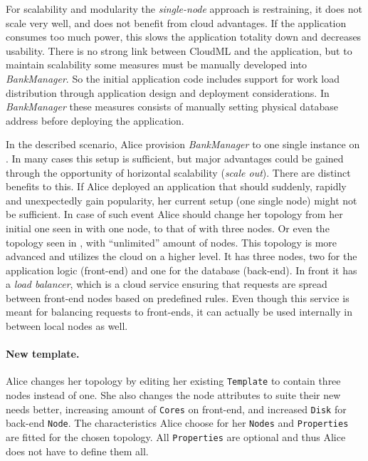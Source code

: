 For scalability and modularity the \emph{single-node} approach is restraining,
\ie it does not scale very well, and does not benefit from cloud advantages.
If the application consumes too much  power, 
this slows the application totality down and decreases usability.
There is no strong link between CloudML and the application, but to maintain
scalability some measures must be manually developed into \emph{BankManager}.
So the initial application code includes support for work load distribution through 
application design and deployment considerations.
In \emph{BankManager} these measures consists of manually setting 
physical database address before deploying the application.

In the described scenario, Alice provision \emph{BankManager} to one single instance on .
In many cases this setup is sufficient, but major advantages
could be gained through the opportunity of horizontal scalability (\emph{scale out}).
There are distinct benefits to this.
If Alice deployed an application that should suddenly, 
rapidly and unexpectedly gain popularity, her current setup (one single node) might not be sufficient.
In case of such event Alice should change her topology from her initial one seen in 
 with one node, to that of  with three nodes.
Or even the topology seen in , with ``unlimited'' amount of nodes.
This topology is more advanced and utilizes the cloud on a higher level.
It has three nodes, two for the application logic (front-end) and one for the database (back-end).
In front it has a \emph{load balancer}, which is a cloud service ensuring that requests
are spread between front-end nodes based on predefined rules.
Even though this service is meant for balancing requests to front-ends,
it can actually be used internally in between local nodes as well.

\paragraph{New template.}

Alice changes her topology by editing her existing \texttt{Template} 
to contain three nodes instead of one. 
She also changes the node attributes to suite their new needs better,
\ie increasing amount of \texttt{Cores} on front-end, and increased \texttt{Disk} for back-end \texttt{Node}.
The characteristics Alice choose for her \texttt{Nodes} and \texttt{Properties} are fitted
for the chosen topology.
All \texttt{Properties} are optional and thus Alice does not have to define them all.

